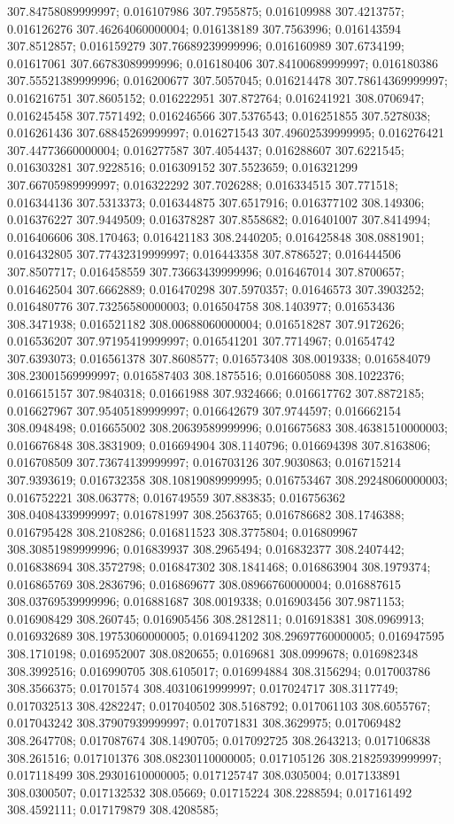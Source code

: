 307.84758089999997; 0.016107986 307.7955875; 0.016109988 307.4213757; 0.016126276 307.46264060000004; 0.016138189 307.7563996; 0.016143594 307.8512857; 0.016159279 307.76689239999996; 0.016160989 307.6734199; 0.01617061 307.66783089999996; 0.016180406 307.84100689999997; 0.016180386 307.55521389999996; 0.016200677 307.5057045; 0.016214478 307.78614369999997; 0.016216751 307.8605152; 0.016222951 307.872764; 0.016241921 308.0706947; 0.016245458 307.7571492; 0.016246566 307.5376543; 0.016251855 307.5278038; 0.016261436 307.68845269999997; 0.016271543 307.49602539999995; 0.016276421 307.44773660000004; 0.016277587 307.4054437; 0.016288607 307.6221545; 0.016303281 307.9228516; 0.016309152 307.5523659; 0.016321299 307.66705989999997; 0.016322292 307.7026288; 0.016334515 307.771518; 0.016344136 307.5313373; 0.016344875 307.6517916; 0.016377102 308.149306; 0.016376227 307.9449509; 0.016378287 307.8558682; 0.016401007 307.8414994; 0.016406606 308.170463; 0.016421183 308.2440205; 0.016425848 308.0881901; 0.016432805 307.77432319999997; 0.016443358 307.8786527; 0.016444506 307.8507717; 0.016458559 307.73663439999996; 0.016467014 307.8700657; 0.016462504 307.6662889; 0.016470298 307.5970357; 0.01646573 307.3903252; 0.016480776 307.73256580000003; 0.016504758 308.1403977; 0.01653436 308.3471938; 0.016521182 308.00688060000004; 0.016518287 307.9172626; 0.016536207 307.97195419999997; 0.016541201 307.7714967; 0.01654742 307.6393073; 0.016561378 307.8608577; 0.016573408 308.0019338; 0.016584079 308.23001569999997; 0.016587403 308.1875516; 0.016605088 308.1022376; 0.016615157 307.9840318; 0.01661988 307.9324666; 0.016617762 307.8872185; 0.016627967 307.95405189999997; 0.016642679 307.9744597; 0.016662154 308.0948498; 0.016655002 308.20639589999996; 0.016675683 308.46381510000003; 0.016676848 308.3831909; 0.016694904 308.1140796; 0.016694398 307.8163806; 0.016708509 307.73674139999997; 0.016703126 307.9030863; 0.016715214 307.9393619; 0.016732358 308.10819089999995; 0.016753467 308.29248060000003; 0.016752221 308.063778; 0.016749559 307.883835; 0.016756362 308.04084339999997; 0.016781997 308.2563765; 0.016786682 308.1746388; 0.016795428 308.2108286; 0.016811523 308.3775804; 0.016809967 308.30851989999996; 0.016839937 308.2965494; 0.016832377 308.2407442; 0.016838694 308.3572798; 0.016847302 308.1841468; 0.016863904 308.1979374; 0.016865769 308.2836796; 0.016869677 308.08966760000004; 0.016887615 308.03769539999996; 0.016881687 308.0019338; 0.016903456 307.9871153; 0.016908429 308.260745; 0.016905456 308.2812811; 0.016918381 308.0969913; 0.016932689 308.19753060000005; 0.016941202 308.29697760000005; 0.016947595 308.1710198; 0.016952007 308.0820655; 0.0169681 308.0999678; 0.016982348 308.3992516; 0.016990705 308.6105017; 0.016994884 308.3156294; 0.017003786 308.3566375; 0.01701574 308.40310619999997; 0.017024717 308.3117749; 0.017032513 308.4282247; 0.017040502 308.5168792; 0.017061103 308.6055767; 0.017043242 308.37907939999997; 0.017071831 308.3629975; 0.017069482 308.2647708; 0.017087674 308.1490705; 0.017092725 308.2643213; 0.017106838 308.261516; 0.017101376 308.08230110000005; 0.017105126 308.21825939999997; 0.017118499 308.29301610000005; 0.017125747 308.0305004; 0.017133891 308.0300507; 0.017132532 308.05669; 0.01715224 308.2288594; 0.017161492 308.4592111; 0.017179879 308.4208585; 